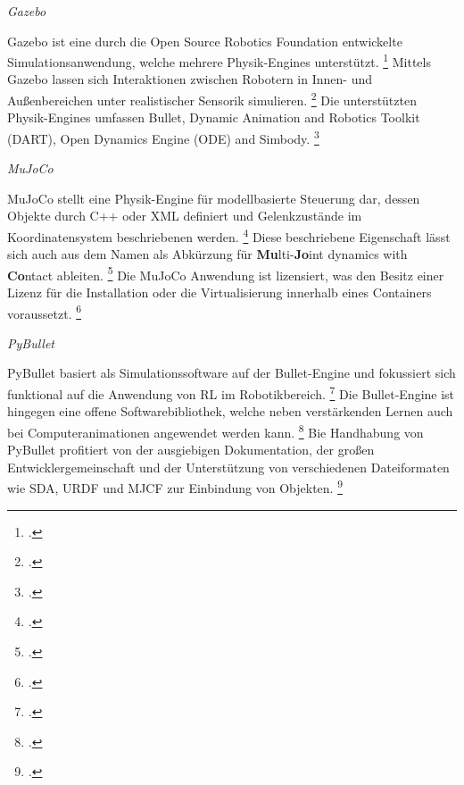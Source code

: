\textit{Gazebo}

Gazebo ist eine durch die Open Source Robotics Foundation entwickelte Simulationsanwendung, welche mehrere Physik-Engines unterstützt. \footcite[Vgl.][S. 7]{Ivaldi.2272014}
Mittels Gazebo lassen sich Interaktionen zwischen Robotern in Innen- und Außenbereichen unter realistischer Sensorik simulieren. \footcite[Vgl.][S. 4]{Ayala.2020}
Die unterstützten Physik-Engines umfassen Bullet, Dynamic Animation and Robotics Toolkit (DART), Open Dynamics Engine (ODE) and Simbody. \footcite[Vgl.][S. 3]{Korber.2021}

\textit{MuJoCo}

MuJoCo stellt eine Physik-Engine für modellbasierte Steuerung dar, dessen Objekte durch C++ oder XML definiert und Gelenkzustände im Koordinatensystem beschriebenen werden. \footcite[Vgl.][S. 1]{Todorov.2012} 
Diese beschriebene Eigenschaft lässt sich auch aus dem Namen als Abkürzung für \textbf{Mu}lti-\textbf{Jo}int dynamics with \textbf{Co}ntact ableiten. \footcite[Vgl.][S. 2]{Todorov.2012}
Die MuJoCo Anwendung ist lizensiert, was den Besitz einer Lizenz für die Installation oder die Virtualisierung innerhalb eines Containers voraussetzt. \footcite[Vgl.][S. 3]{Korber.2021}

\textit{PyBullet}

PyBullet basiert als Simulationssoftware auf der Bullet-Engine und fokussiert sich funktional auf die Anwendung von RL im Robotikbereich. \footcite[Vgl.][S. 3]{Korber.2021}
Die Bullet-Engine ist hingegen eine offene Softwarebibliothek, welche neben verstärkenden Lernen auch bei Computeranimationen angewendet werden kann. \footcite[Vgl.][S. 7]{Ivaldi.2272014}
Bie Handhabung von PyBullet profitiert von der ausgiebigen Dokumentation, der großen Entwicklergemeinschaft und der Unterstützung von verschiedenen Dateiformaten wie SDA, URDF und MJCF zur Einbindung von Objekten. \footcite[Vgl.][S. 6]{Korber.2021}

